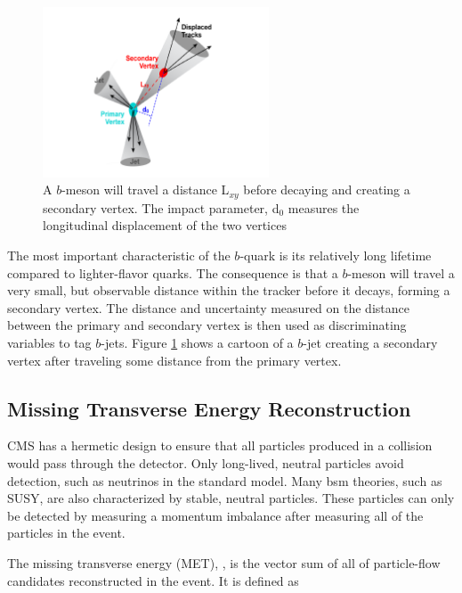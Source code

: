 \begin{figure}[h]
   \centering
  \includegraphics[width=0.6\textwidth]{Figures/Reconstruction_Diagrams/Jets__bTagging.pdf}
  \caption{A $b$-meson will travel a distance L$_{xy}$ before decaying
  and creating a secondary vertex.  The impact parameter, d$_{0}$
  measures the longitudinal displacement of the two vertices} \label{fig:bTagging}
\end{figure}

\par The most important characteristic of the $b$-quark is its
relatively long lifetime compared to lighter-flavor quarks.  The
consequence is that a $b$-meson will travel a very small, but
observable distance within the tracker before it decays, forming a
secondary vertex.  The distance and uncertainty measured on the
distance between the primary and secondary vertex is then used as
discriminating variables to tag $b$-jets.  Figure \ref{fig:bTagging}
shows a cartoon of a $b$-jet creating a secondary vertex after
traveling some distance from the primary vertex.   

\subsection{Missing Transverse Energy Reconstruction}

\par CMS has a hermetic design to ensure that all particles produced
in a collision would pass through the detector.  Only long-lived,
neutral particles avoid detection, such as neutrinos in the standard
model.  Many \acrshort{bsm} theories, such as SUSY, are also
characterized by stable, neutral particles.  These particles can only
be detected by measuring a momentum imbalance after measuring all of
the particles in the event.

\par The missing transverse energy (MET), \ETslash, is the vector sum of
all of particle-flow candidates reconstructed in the event.  It is
defined as 

